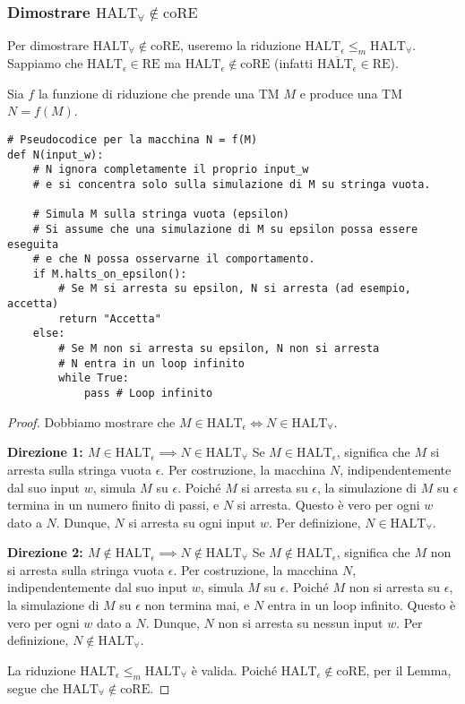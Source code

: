 \documentclass[a4paper]{article}
\begin{document}
\subsubsection{Dimostrare $\text{HALT}_\forall \notin \text{coRE}$}
Per dimostrare $\text{HALT}_\forall \notin \text{coRE}$, useremo la riduzione $\text{HALT}_\epsilon \le_m \text{HALT}_\forall$.
Sappiamo che $\text{HALT}_\epsilon \in \text{RE}$ ma $\text{HALT}_\epsilon \notin \text{coRE}$ (infatti $\overline{\text{HALT}_\epsilon} \in \text{RE}$).

Sia $f$ la funzione di riduzione che prende una TM $M$ e produce una TM $N = f(M)$.
\begin{verbatim}
# Pseudocodice per la macchina N = f(M)
def N(input_w):
    # N ignora completamente il proprio input_w
    # e si concentra solo sulla simulazione di M su stringa vuota.
    
    # Simula M sulla stringa vuota (epsilon)
    # Si assume che una simulazione di M su epsilon possa essere eseguita
    # e che N possa osservarne il comportamento.
    if M.halts_on_epsilon():
        # Se M si arresta su epsilon, N si arresta (ad esempio, accetta)
        return "Accetta"
    else:
        # Se M non si arresta su epsilon, N non si arresta
        # N entra in un loop infinito
        while True:
            pass # Loop infinito
\end{verbatim}

\begin{proof}
Dobbiamo mostrare che $M \in \text{HALT}_\epsilon \iff N \in \text{HALT}_\forall$.

\textbf{Direzione 1: $M \in \text{HALT}_\epsilon \implies N \in \text{HALT}_\forall$}
Se $M \in \text{HALT}_\epsilon$, significa che $M$ si arresta sulla stringa vuota $\epsilon$.
Per costruzione, la macchina $N$, indipendentemente dal suo input $w$, simula $M$ su $\epsilon$. Poiché $M$ si arresta su $\epsilon$, la simulazione di $M$ su $\epsilon$ termina in un numero finito di passi, e $N$ si arresta.
Questo è vero per ogni $w$ dato a $N$. Dunque, $N$ si arresta su ogni input $w$. Per definizione, $N \in \text{HALT}_\forall$.

\textbf{Direzione 2: $M \notin \text{HALT}_\epsilon \implies N \notin \text{HALT}_\forall$}
Se $M \notin \text{HALT}_\epsilon$, significa che $M$ non si arresta sulla stringa vuota $\epsilon$.
Per costruzione, la macchina $N$, indipendentemente dal suo input $w$, simula $M$ su $\epsilon$. Poiché $M$ non si arresta su $\epsilon$, la simulazione di $M$ su $\epsilon$ non termina mai, e $N$ entra in un loop infinito.
Questo è vero per ogni $w$ dato a $N$. Dunque, $N$ non si arresta su nessun input $w$. Per definizione, $N \notin \text{HALT}_\forall$.

La riduzione $\text{HALT}_\epsilon \le_m \text{HALT}_\forall$ è valida.
Poiché $\text{HALT}_\epsilon \notin \text{coRE}$, per il Lemma, segue che $\text{HALT}_\forall \notin \text{coRE}$.
\end{proof}
\end{document}
